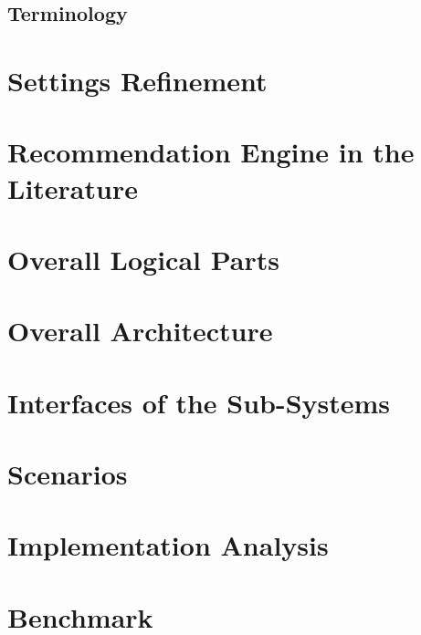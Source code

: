 \documentclass{article}
\begin{document}
\subsection{Terminology}
\label{sec:terminology}

\section{Settings Refinement}
\label{sec:settings_refinement}

\section{Recommendation Engine in the Literature}
\label{sec:state_of_the_art}

\section{Overall Logical Parts}
\section{Overall Architecture}
\section{Interfaces of the Sub-Systems}
\section{Scenarios}
\section{Implementation Analysis}
\section{Benchmark}
\end{document}
